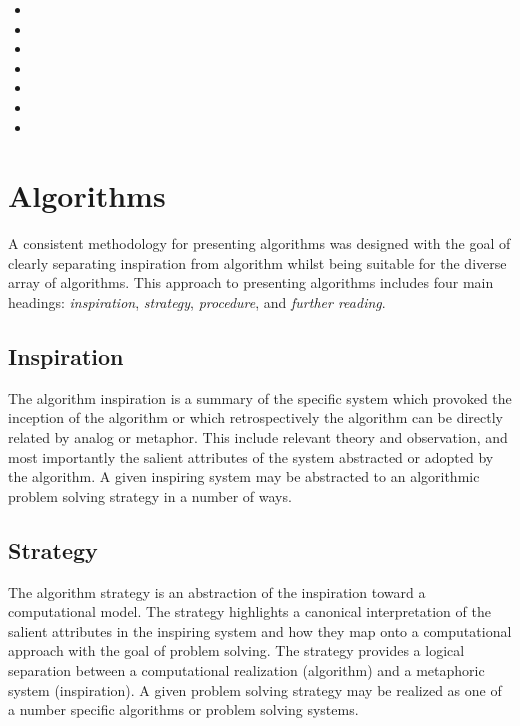 \begin{itemize}
	\small
	\item {}
	\item {}
	\item {}
	\item {}
	\item {}
	\item {}
	\item {}
\end{itemize}


\section{Algorithms}
\label{sec:intro:techniques}
A consistent methodology for presenting algorithms was designed with the goal of clearly separating inspiration from algorithm whilst being suitable for the diverse array of algorithms. This approach to presenting algorithms includes four main headings: \emph{inspiration}, \emph{strategy}, \emph{procedure}, and \emph{further reading}.

\subsection{Inspiration}
The algorithm inspiration is a summary of the specific system which provoked the inception of the algorithm or which retrospectively the algorithm can be directly related by analog or metaphor. This include relevant theory and observation, and most importantly the salient attributes of the system abstracted or adopted by the algorithm. A given inspiring system may be abstracted to an algorithmic problem solving strategy in a number of ways.

\subsection{Strategy}
The algorithm strategy is an abstraction of the inspiration toward a computational model. The strategy highlights a canonical interpretation of the salient attributes in the inspiring system and how they map onto a computational approach with the goal of problem solving. The strategy provides a logical separation between a computational realization (algorithm) and a metaphoric system (inspiration). A given problem solving strategy may be realized as one of a number specific algorithms or problem solving systems.

